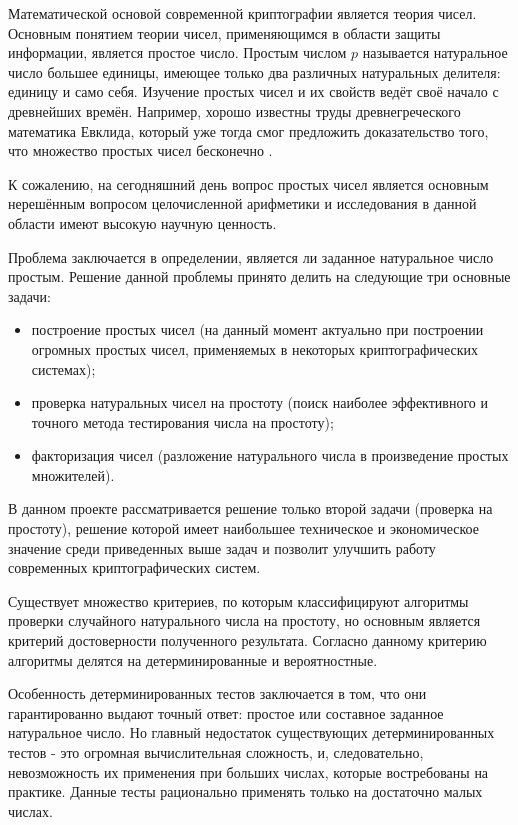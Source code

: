 \documentclass[
russian,
cp1251,
14pt,
simple
]{eskdtext}
\theoremstyle{definition}
\begin{document}
Математической основой современной криптографии является теория чисел. Основным понятием теории чисел, применяющимся в области защиты информации, является простое число. Простым числом $p$ называется натуральное число большее единицы, имеющее только два различных натуральных делителя: единицу и само себя. Изучение простых чисел и их свойств ведёт своё начало с древнейших времён. Например, хорошо известны труды древнегреческого математика Евклида, который уже тогда смог предложить доказательство того, что множество простых чисел бесконечно \cite{Euclid}.

К сожалению, на сегодняшний день вопрос простых чисел является основным нерешённым вопросом целочисленной арифметики и исследования в данной области имеют высокую научную ценность.

Проблема заключается в определении, является ли заданное натуральное число простым. Решение данной проблемы принято делить на следующие три основные задачи:

\begin{itemize}
\item построение простых чисел (на данный момент актуально при построении огромных простых чисел, применяемых в некоторых криптографических системах);
\item проверка натуральных чисел на простоту (поиск наиболее эффективного и точного метода тестирования числа на простоту);
\item факторизация чисел (разложение натурального числа в произведение простых множителей).
\end{itemize} 

В данном проекте рассматривается решение только второй задачи (проверка на простоту), решение которой имеет наибольшее техническое и экономическое значение среди приведенных выше задач  и  позволит улучшить работу современных криптографических систем.

Существует множество критериев, по которым классифицируют алгоритмы проверки случайного натурального числа на простоту, но основным является критерий достоверности полученного результата. Согласно данному критерию алгоритмы делятся на детерминированные и вероятностные.

Особенность детерминированных тестов заключается в том, что они гарантированно выдают точный ответ: простое или составное заданное натуральное число. Но главный недостаток существующих детерминированных тестов - это огромная вычислительная сложность, и, следовательно, невозможность их применения при больших числах, которые востребованы на практике. Данные тесты рационально применять только на достаточно малых числах.
\end{document}
